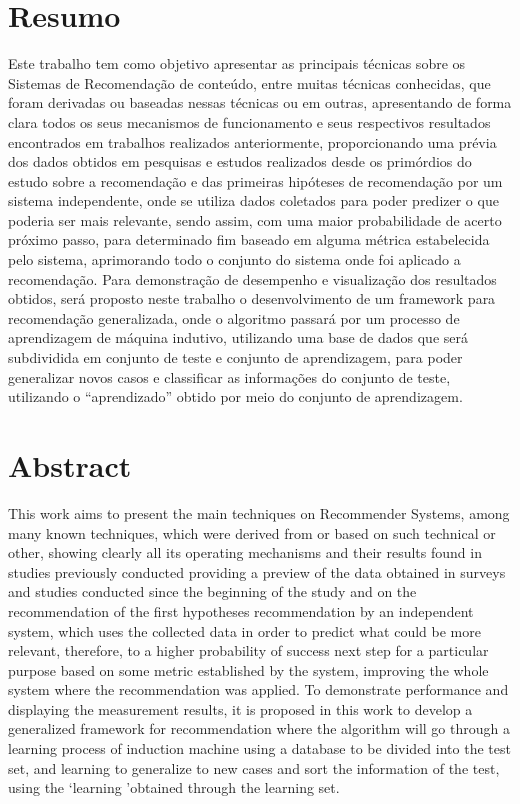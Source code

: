 \documentclass[12pt,
				openright,
				twoside,
				a4paper,
				apter=TITLE,
				section=TITLE,
				subsection=TITLE,
				chapter=TITLE,
				english,
				brazil]{abntex2}
\begin{document}
\chapter*{Resumo}
Este trabalho tem como objetivo apresentar as principais técnicas sobre os Sistemas de Recomendação de conteúdo, entre muitas técnicas conhecidas, que foram derivadas ou baseadas nessas técnicas ou em outras, apresentando de forma clara todos  os seus mecanismos de funcionamento e seus respectivos resultados encontrados em trabalhos realizados anteriormente, proporcionando uma prévia dos dados obtidos em pesquisas e estudos realizados desde os primórdios do estudo sobre a recomendação e das primeiras hipóteses de recomendação por um sistema independente, onde se utiliza dados coletados para poder predizer o que poderia ser mais relevante, sendo assim, com uma maior probabilidade de acerto próximo passo, para determinado fim baseado em alguma métrica estabelecida pelo sistema, aprimorando todo o conjunto do sistema onde foi aplicado a recomendação. Para demonstração de desempenho e visualização dos resultados obtidos, será proposto neste trabalho o desenvolvimento de um framework para recomendação generalizada, onde o algoritmo passará por um processo de aprendizagem de máquina indutivo, utilizando uma base de dados que será subdividida em conjunto de teste e conjunto de aprendizagem, para poder generalizar novos casos e classificar as informações do conjunto de teste, utilizando o ``aprendizado'' obtido por meio do conjunto de aprendizagem. 


\chapter*{Abstract}
This work aims to present the main techniques on Recommender Systems, among many known techniques, which were derived from or based on such technical or other, showing clearly all its operating mechanisms and their results found in studies previously conducted providing a preview of the data obtained in surveys and studies conducted since the beginning of the study and on the recommendation of the first hypotheses recommendation by an independent system, which uses the collected data in order to predict what could be more relevant, therefore, to a higher probability of success next step for a particular purpose based on some metric established by the system, improving the whole system where the recommendation was applied. To demonstrate performance and displaying the measurement results, it is proposed in this work to develop a generalized framework for recommendation where the algorithm will go through a learning process of induction machine using a database to be divided into the test set, and learning to generalize to new cases and sort the information of the test, using the `learning 'obtained through the learning set.
\end{document}
